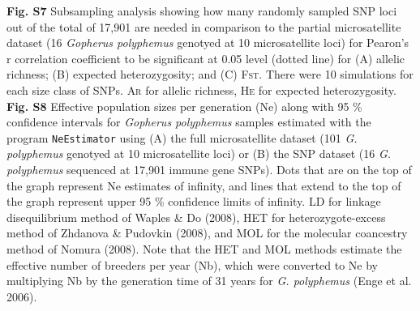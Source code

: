 \documentclass[english]{article}\usepackage[]{graphicx}\usepackage[]{color}
\begin{document}
\textbf{Fig. S7} Subsampling analysis showing how many randomly sampled SNP loci out of the total of 17,901 are needed in comparison to the partial microsatellite dataset (16 \textit{Gopherus polyphemus} genotyed at 10 microsatellite loci) for Pearon's r correlation coefficient to be significant at 0.05 level (dotted line) for (A) allelic richness; (B) expected heterozygosity; and (C) \textsc{Fst}. There were 10 simulations for each size class of SNPs. \textsc{Ar} for allelic richness, \textsc{He} for expected heterozygosity.\\
\textbf{Fig. S8} Effective population sizes per generation (Ne) along with 95 \% confidence intervals for \textit{Gopherus polyphemus} samples estimated with the program \texttt{NeEstimator} using (A) the full microsatellite dataset (101 \textit{G. polyphemus} genotyed at 10 microsatellite loci) or (B) the SNP dataset (16 \textit{G. polyphemus} sequenced at 17,901 immune gene SNPs). Dots that are on the top of the graph represent Ne estimates of infinity, and lines that extend to the top of the graph represent upper 95 \% confidence limits of infinity. LD for linkage disequilibrium method of Waples \& Do (2008), HET for heterozygote-excess method of Zhdanova \& Pudovkin (2008), and MOL for the molecular coancestry method of Nomura (2008). Note that the HET and MOL methods estimate the effective number of breeders per year (Nb), which were converted to Ne by multiplying Nb by the generation time of 31 years for \textit{G. polyphemus} (Enge et al. 2006).\\



\pagebreak
\singlespacing
\end{document}
